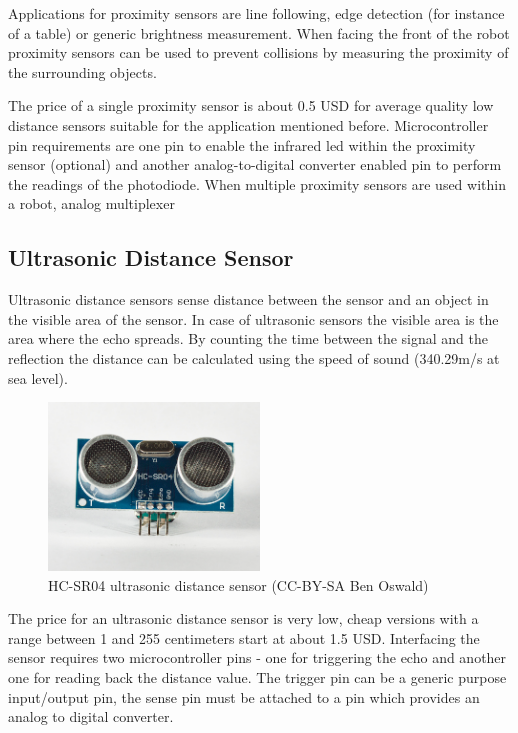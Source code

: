 \documentclass[11pt,a4paper]{article}
\begin{document}
Applications for proximity sensors are line following, edge detection (for instance of a table) or generic brightness measurement. When facing the front of the robot proximity sensors can be used to prevent collisions by measuring the proximity of the surrounding objects.

The price of a single proximity sensor is about 0.5 USD for average quality low distance sensors suitable for the application mentioned before. Microcontroller pin requirements are one pin to enable the infrared led within the proximity sensor (optional) and another analog-to-digital converter enabled pin to perform the readings of the photodiode. When multiple proximity sensors are used within a robot, analog multiplexer 

\subsection{Ultrasonic Distance Sensor}
Ultrasonic distance sensors sense distance between the sensor and an object in the visible area of the sensor. In case of ultrasonic sensors the visible area is the area where the echo spreads. By counting the time between the signal and the reflection the distance can be calculated using the speed of sound (340.29m/s at sea level). 

\begin{figure}[h!]
  \centering
  \includegraphics[width=0.5\textwidth]{images/30_ultrasonic.jpg}
  \caption{HC-SR04 ultrasonic distance sensor (CC-BY-SA Ben Oswald)}
\end{figure}

The price for an ultrasonic distance sensor is very low, cheap versions with a range between 1 and 255 centimeters start at about 1.5 USD. Interfacing the sensor requires two microcontroller pins - one for triggering the echo and another one for reading back the distance value. The trigger pin can be a generic purpose input/output pin, the sense pin must be attached to a pin which provides an analog to digital converter.
\end{document}
